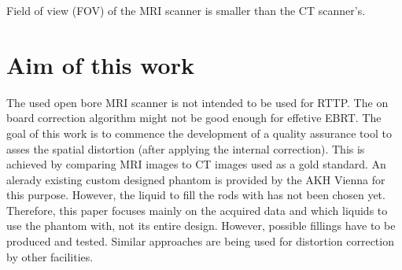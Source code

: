 Field of view (FOV) of the MRI scanner is smaller than the CT scanner's.

\section{Aim of this work}
The used open bore MRI scanner is not intended to be used for RTTP. The on board correction algorithm might not be good enough for effetive EBRT.
The goal of this work is to commence the development of a quality assurance tool to asses the spatial distortion (after applying the internal correction).
This is achieved by comparing MRI images to CT images used as a gold standard.
An alerady existing custom designed phantom is provided by the AKH Vienna for this purpose.
However, the liquid to fill the rods with has not been chosen yet.
Therefore, this paper focuses mainly on the acquired data and which liquids to use the phantom with, not its entire design.
However, possible fillings have to be produced and tested.
Similar approaches are being used for distortion correction by other facilities. \cite{Price2015, Petersch2004, Torfeh2015, Wang2004, Wang2004b, Mizowaki2000}




\newpage